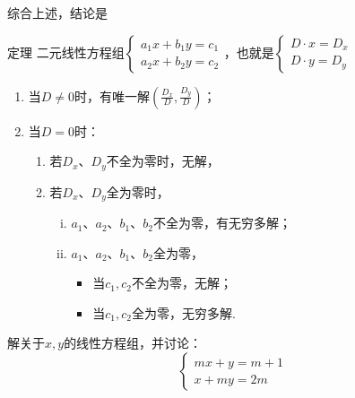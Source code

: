 综合上述，结论是

\begin{thm}{定理}
  二元线性方程组$\begin{cases}
    a_1x+b_1y=c_1\\
    a_2x+b_2y=c_2
  \end{cases}$，也就是$\begin{cases}
    D\cdot x=D_x\\
    D\cdot y=D_y
  \end{cases}$
\begin{enumerate}
  \item 当$D\ne 0$时，有唯一解$\left(\frac{D_x}{D},\frac{D_y}{D}\right)$；
  \item 当$D=0$时：
\begin{enumerate}[(1)]
  \item 若$D_x$、$D_y$不全为零时，无解，
  \item 若$D_x$、$D_y$全为零时，
\begin{enumerate}[(i)]
  \item $a_1$、$a_2$、$b_1$、$b_2$不全为零，有无穷多解；
  \item $a_1$、$a_2$、$b_1$、$b_2$全为零，
\begin{itemize}
  \item 当$c_1,c_2$不全为零，无解；
  \item 当$c_1,c_2$全为零，无穷多解.
\end{itemize}
\end{enumerate}
\end{enumerate}
\end{enumerate}
\end{thm}

\begin{example}
  解关于$x,y$的线性方程组，并讨论：
\[\begin{cases}
  mx+y=m+1\\
  x+my=2m
\end{cases}\]
\end{example}

